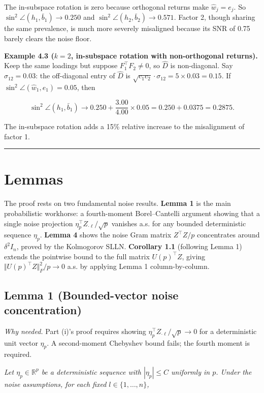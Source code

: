 \documentclass{article}
\theoremstyle{remark}
\begin{document}
The in-subspace rotation is zero because orthogonal returns make $\hat{w}_j = e_j$. So $\sin^2\angle(h_1, \bar{b}_1) \to 0.250$ and $\sin^2\angle(h_2, \bar{b}_2) \to 0.571$. Factor 2, though sharing the same prevalence, is much more severely misaligned because its SNR of 0.75 barely clears the noise floor.

\textbf{Example 4.3 ($k=2$, in-subspace rotation with non-orthogonal returns).} Keep the same loadings but suppose $F_1^\top F_2 \ne 0$, so $\hat{D}$ is non-diagonal. Say $\sigma_{12} = 0.03$: the off-diagonal entry of $\hat{D}$ is $\sqrt{c_1 c_2}\cdot\sigma_{12} = 5\times 0.03 = 0.15$. If $\sin^2\angle(\hat{w}_1, e_1) = 0.05$, then

\[
\sin^2\angle(h_1, \bar{b}_1) \to 0.250 + \frac{3.00}{4.00}\times 0.05 = 0.250 + 0.0375 = 0.2875.
\]

The in-subspace rotation adds a 15\% relative increase to the misalignment of factor 1.

\medskip\noindent\rule{\linewidth}{0.4pt}\medskip

\section{Lemmas}

The proof rests on two fundamental noise results. \textbf{Lemma 1} is the main probabilistic workhorse: a fourth-moment Borel–Cantelli argument showing that a single noise projection $\eta_p^\top Z_{\cdot\ell}/\sqrt{p}$ vanishes a.s. for any bounded deterministic sequence $\eta_p$. \textbf{Lemma 4} shows the noise Gram matrix $Z^\top Z/p$ concentrates around $\delta^2 I_n$, proved by the Kolmogorov SLLN. \textbf{Corollary 1.1} (following Lemma 1) extends the pointwise bound to the full matrix $U(p)^\top Z$, giving $\Vert U(p)^\top Z\Vert_F^2/p \to 0$ a.s. by applying Lemma 1 column-by-column.

\subsection{Lemma 1 (Bounded-vector noise concentration)}

\textit{Why needed.} Part (i)'s proof requires showing $\eta_p^\top Z_{\cdot\ell}/\sqrt{p}\to 0$ for a deterministic unit vector $\eta_p$. A second-moment Chebyshev bound fails; the fourth moment is required.

\textit{Let $\eta_p\in\mathbb{R}^p$ be a deterministic sequence with $|\eta_p|\le C$ uniformly in $p$. Under the noise assumptions, for each fixed $l\in\{1,\ldots,n\}$,}
\end{document}

